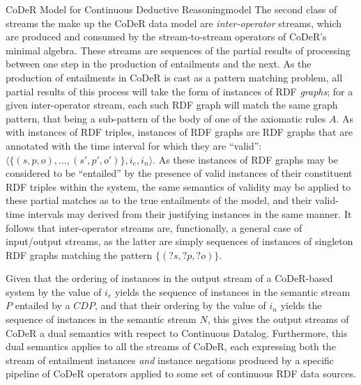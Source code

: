 \begin{nestedsection}{CoDeR Model for Continuous Deductive Reasoning}{model}
	The second class of streams the make up the CoDeR data model are \emph{inter-operator} streams, which are produced and consumed by the stream-to-stream operators of CoDeR's minimal algebra.
	These streams are sequences of the partial results of processing between one step in the production of entailments and the next.
	As the production of entailments in CoDeR is cast as a pattern matching problem, all partial results of this process will take the form of instances of RDF \emph{graphs};
	for a given inter-operator stream, each such RDF graph will match the same graph pattern, that being a sub-pattern of the body of one of the axiomatic rules $A$.
	As with instances of RDF triples, instances of RDF graphs are RDF graphs that are annotated with the time interval for which they are ``valid'': ${\langle \{(s,p,o),\dots,(s',p',o')\},i_{e},i_{n} \rangle}$.
	As these instances of RDF graphs may be considered to be ``entailed'' by the presence of valid instances of their constituent RDF triples within the system, the same semantics of validity may be applied to these partial matches as to the true entailments of the model, and their valid-time intervals may derived from their justifying instances in the same manner.
	It follows that inter-operator streams are, functionally, a general case of input/output streams, as the latter are simply sequences of instances of singleton RDF graphs matching the pattern ${\{(?s,?p,?o)\}}$.

	Given that the ordering of instances in the output stream of a CoDeR-based system by the value of $i_{e}$ yields the sequence of instances in the semantic stream $P$ entailed by a ${CDP}$, and that their ordering by the value of $i_{n}$ yields the sequence of instances in the semantic stream $N$, this gives the output streams of CoDeR a dual semantics with respect to Continuous Datalog.
	Furthermore, this dual semantics applies to all the streams of CoDeR, each expressing both the stream of entailment instances \emph{and} instance negations produced by a specific pipeline of CoDeR operators applied to some set of continuous RDF data sources.



\end{nestedsection}